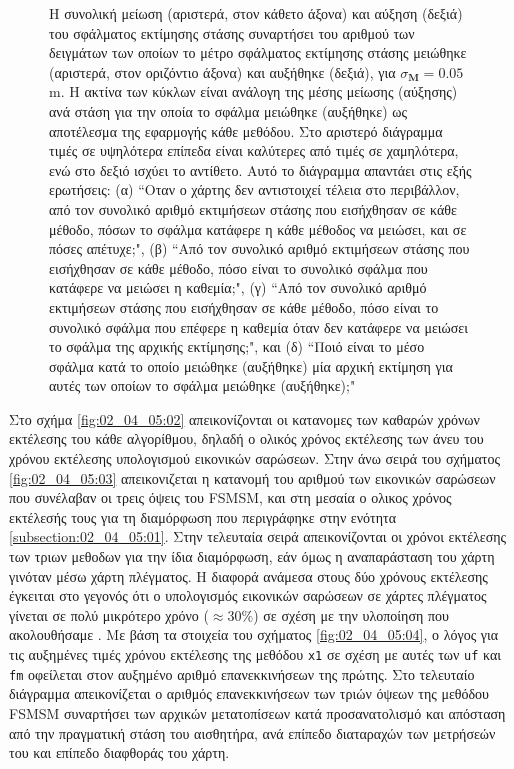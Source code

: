 \begin{figure}[!h]\vspace{3cm}%
  
  \vspace{1cm}
  \caption{\small Η συνολική μείωση (αριστερά, στον κάθετο άξονα) και αύξηση
           (δεξιά) του σφάλματος εκτίμησης στάσης συναρτήσει του αριθμού των
           δειγμάτων των οποίων το μέτρο σφάλματος εκτίμησης στάσης μειώθηκε
           (αριστερά, στον οριζόντιο άξονα) και αυξήθηκε (δεξιά), για
           $\sigma_{\bm{M}} = 0.05$ m. Η ακτίνα των κύκλων είναι ανάλογη της
           μέσης μείωσης (αύξησης) ανά στάση για την οποία το σφάλμα μειώθηκε
           (αυξήθηκε) ως αποτέλεσμα της εφαρμογής κάθε μεθόδου. Στο αριστερό
           διάγραμμα τιμές σε υψηλότερα επίπεδα είναι καλύτερες από τιμές σε
           χαμηλότερα, ενώ στο δεξιό ισχύει το αντίθετο. Αυτό το
           διάγραμμα απαντάει στις εξής ερωτήσεις: (α) ``Oταν ο χάρτης δεν
           αντιστοιχεί τέλεια στο περιβάλλον, από τον συνολικό αριθμό
           εκτιμήσεων στάσης που εισήχθησαν σε κάθε μέθοδο, πόσων το σφάλμα
           κατάφερε η κάθε μέθοδος να μειώσει, και σε πόσες απέτυχε;", (β)
           ``Από τον συνολικό αριθμό εκτιμήσεων στάσης που εισήχθησαν σε κάθε
           μέθοδο, πόσο είναι το συνολικό σφάλμα που κατάφερε να μειώσει η
           καθεμία;", (γ) ``Από τον συνολικό αριθμό εκτιμήσεων στάσης που
           εισήχθησαν σε κάθε μέθοδο, πόσο είναι το συνολικό σφάλμα που επέφερε
           η καθεμία όταν δεν κατάφερε να μειώσει το σφάλμα της αρχικής
           εκτίμησης;", και (δ) ``Ποιό είναι το μέσο σφάλμα κατά το οποίο
           μειώθηκε (αυξήθηκε) μία αρχική εκτίμηση για αυτές των οποίων το
           σφάλμα μειώθηκε (αυξήθηκε);"}
  \label{fig:02_04_05:01_circles_sm5}
\end{figure}

Στο σχήμα \ref{fig:02_04_05:02} απεικονίζονται οι κατανομες των καθαρών χρόνων
εκτέλεσης του κάθε αλγορίθμου, δηλαδή ο ολικός χρόνος εκτέλεσης των άνευ του
χρόνου εκτέλεσης υπολογισμού εικονικών σαρώσεων. Στην άνω σειρά του σχήματος
\ref{fig:02_04_05:03} απεικονιζεται η κατανομή του αριθμού των εικονικών
σαρώσεων που συνέλαβαν οι τρεις όψεις του FSMSM, και στη μεσαία ο ολικος χρόνος
εκτέλεσής τους για τη διαμόρφωση που περιγράφηκε στην ενότητα
\ref{subsection:02_04_05:01}. Στην τελευταία σειρά απεικονίζονται οι χρόνοι
εκτέλεσης των τριων μεθοδων για την ίδια διαμόρφωση, εάν όμως η αναπαράσταση του
χάρτη γινόταν μέσω χάρτη πλέγματος. Η διαφορά ανάμεσα στους δύο χρόνους
εκτέλεσης έγκειται στο γεγονός ότι ο υπολογισμός εικονικών σαρώσεων σε χάρτες
πλέγματος γίνεται σε πολύ μικρότερο χρόνο ($\approx 30\%$) σε σχέση με την
υλοποίηση που ακολουθήσαμε \cite{Walsh2018}. Με βάση τα στοιχεία του σχήματος
\ref{fig:02_04_05:04}, ο λόγος για τις αυξημένες τιμές χρόνου εκτέλεσης της
μεθόδου \texttt{x1} σε σχέση με αυτές των \texttt{uf} και \texttt{fm} οφείλεται
στον αυξημένο αριθμό επανεκκινήσεων της πρώτης. Στο τελευταίο διάγραμμα
απεικονίζεται ο αριθμός επανεκκινήσεων των τριών όψεων της μεθόδου FSMSM
συναρτήσει των αρχικών μετατοπίσεων κατά προσανατολισμό και απόσταση από
την πραγματική στάση του αισθητήρα, ανά επίπεδο διαταραχών των μετρήσεών του
και επίπεδο διαφθοράς του χάρτη.

